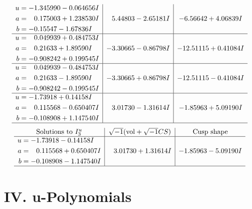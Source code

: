 \documentclass[1p]{elsarticle_modified}
\theoremstyle{definition}
\newcommand{\I}{\sqrt{-1}}
\begin{document}
$$\begin{array}{c|c|c}
\begin{aligned}
u &= -1.345990 - 0.064656 I \\
a &= \phantom{-}0.175003 + 1.238530 I \\
b &= -0.15547 - 1.67836 I\end{aligned}
 & \phantom{-}5.44803 - 2.65181 I & -6.56642 + 4.06839 I \\ \hline\begin{aligned}
u &= \phantom{-}0.049939 + 0.484753 I \\
a &= \phantom{-}0.21633 + 1.89590 I \\
b &= -0.908242 + 0.199545 I\end{aligned}
 & -3.30665 - 0.86798 I & -12.51115 + 0.41084 I \\ \hline\begin{aligned}
u &= \phantom{-}0.049939 - 0.484753 I \\
a &= \phantom{-}0.21633 - 1.89590 I \\
b &= -0.908242 - 0.199545 I\end{aligned}
 & -3.30665 + 0.86798 I & -12.51115 - 0.41084 I \\ \hline\begin{aligned}
u &= -1.73918 + 0.14158 I \\
a &= \phantom{-}0.115568 - 0.650407 I \\
b &= -0.108908 + 1.147540 I\end{aligned}
 & \phantom{-}3.01730 - 1.31614 I & -1.85963 + 5.09190 I\\
 \hline 
 \end{array}$$\newpage$$\begin{array}{c|c|c}  
\text{Solutions to }I^u_{3}& \I (\text{vol} + \sqrt{-1}CS) & \text{Cusp shape}\\
 \hline 
\begin{aligned}
u &= -1.73918 - 0.14158 I \\
a &= \phantom{-}0.115568 + 0.650407 I \\
b &= -0.108908 - 1.147540 I\end{aligned}
 & \phantom{-}3.01730 + 1.31614 I & -1.85963 - 5.09190 I\\
 \hline 
 \end{array}$$\newpage
\newpage\renewcommand{\arraystretch}{1}
\centering \section*{ IV. u-Polynomials}
\end{document}
